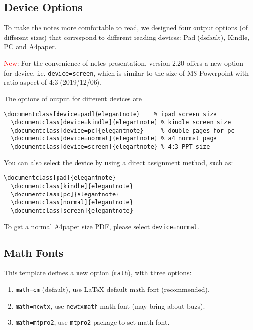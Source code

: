 \documentclass[en,hazy,blue,screen,14pt]{elegantnote}
\begin{document}
\newpage
\subsection{Device Options}

To make the notes more comfortable to read, we designed four output options (of different sizes) that correspond to different reading devices: Pad (default), Kindle, PC and A4paper. 

\textcolor{red}{New}: For the convenience of notes presentation, version 2.20 offers a new option for device, i.e. \lstinline{device=screen}, which is similar to the size of MS Powerpoint with ratio aspect of 4:3 (2019/12/06).

The options of output for different devices are
\begin{lstlisting}[frame=none]  
  \documentclass[device=pad]{elegantnote}    % ipad screen size
  \documentclass[device=kindle]{elegantnote} % kindle screen size
  \documentclass[device=pc]{elegantnote}     % double pages for pc 
  \documentclass[device=normal]{elegantnote} % a4 normal page
  \documentclass[device=screen]{elegantnote} % 4:3 PPT size
\end{lstlisting}

\begin{note}
You can also select the device by using a direct assignment method, such as:
\end{note}

\begin{lstlisting}[frame=none]  
  \documentclass[pad]{elegantnote}
  \documentclass[kindle]{elegantnote}
  \documentclass[pc]{elegantnote}
  \documentclass[normal]{elegantnote}
  \documentclass[screen]{elegantnote}
\end{lstlisting}

\begin{note}
To get a normal A4paper size PDF, please select \lstinline{device=normal}.
\end{note}

\subsection{Math Fonts}

This template defines a new option (\lstinline{math}), with three options:

\begin{enumerate}
  \item \lstinline{math=cm} (default), use \LaTeX{} default math font (recommended).
  \item \lstinline{math=newtx}, use \lstinline{newtxmath} math font (may bring about bugs).
  \item \lstinline{math=mtpro2}, use \lstinline{mtpro2} package to set math font.
\end{enumerate}
\end{document}
